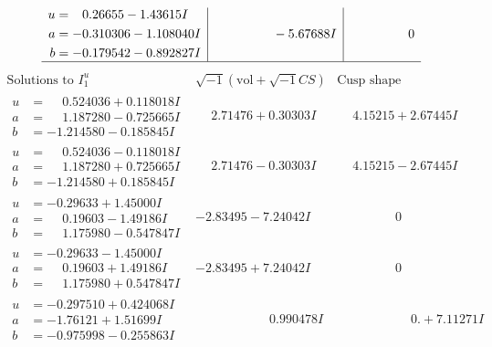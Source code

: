 \documentclass[1p]{elsarticle_modified}
\theoremstyle{definition}
\newcommand{\I}{\sqrt{-1}}
\begin{document}
$$\begin{array}{c|c|c}
\begin{aligned}
u &= \phantom{-}0.26655 - 1.43615 I \\
a &= -0.310306 - 1.108040 I \\
b &= -0.179542 - 0.892827 I\end{aligned}
 & \phantom{-0.000000 } -5.67688 I & \phantom{-0.000000 } 0\\
 \hline 
 \end{array}$$\newpage$$\begin{array}{c|c|c}  
\text{Solutions to }I^u_{1}& \I (\text{vol} + \sqrt{-1}CS) & \text{Cusp shape}\\
 \hline 
\begin{aligned}
u &= \phantom{-}0.524036 + 0.118018 I \\
a &= \phantom{-}1.187280 - 0.725665 I \\
b &= -1.214580 - 0.185845 I\end{aligned}
 & \phantom{-}2.71476 + 0.30303 I & \phantom{-}4.15215 + 2.67445 I \\ \hline\begin{aligned}
u &= \phantom{-}0.524036 - 0.118018 I \\
a &= \phantom{-}1.187280 + 0.725665 I \\
b &= -1.214580 + 0.185845 I\end{aligned}
 & \phantom{-}2.71476 - 0.30303 I & \phantom{-}4.15215 - 2.67445 I \\ \hline\begin{aligned}
u &= -0.29633 + 1.45000 I \\
a &= \phantom{-}0.19603 - 1.49186 I \\
b &= \phantom{-}1.175980 - 0.547847 I\end{aligned}
 & -2.83495 - 7.24042 I & \phantom{-0.000000 } 0 \\ \hline\begin{aligned}
u &= -0.29633 - 1.45000 I \\
a &= \phantom{-}0.19603 + 1.49186 I \\
b &= \phantom{-}1.175980 + 0.547847 I\end{aligned}
 & -2.83495 + 7.24042 I & \phantom{-0.000000 } 0 \\ \hline\begin{aligned}
u &= -0.297510 + 0.424068 I \\
a &= -1.76121 + 1.51699 I \\
b &= -0.975998 - 0.255863 I\end{aligned}
 & \phantom{-0.000000 -}0.990478 I & \phantom{-0.000000 -}0. + 7.11271 I \\ \hline\begin{aligned}

\end{aligned}
\end{array}$$
\end{document}
